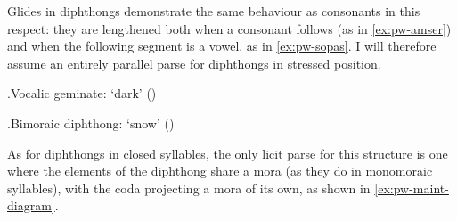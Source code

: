Glides in diphthongs demonstrate the same behaviour as consonants in this respect: they are lengthened both when a consonant follows (as in \ref{ex:pw-amser}) and when the following segment is a vowel, as in \ref{ex:pw-sopas}. I will therefore assume an entirely parallel parse for diphthongs in stressed position.

\ex.Vocalic geminate: \ipa{[ˈtəuiɬ]} `dark' ()\\

\ex.\label{ex:eira-diagram}Bimoraic diphthong: \ipa{[ˈeira]} `snow' ()\\

As for diphthongs in closed syllables, the only licit parse for this structure is one where the elements of the diphthong share a mora (as they do in monomoraic syllables), with the coda projecting a mora of its own, as shown in \cref{ex:pw-maint-diagram}.

